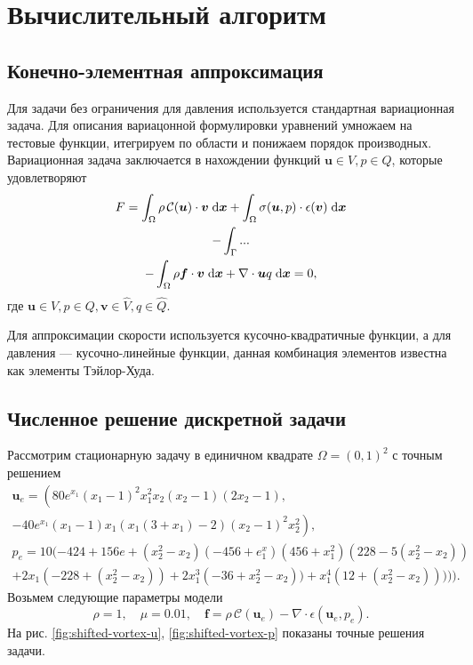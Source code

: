 \documentclass[a4paper,10pt]{report}
\begin{document}
\section{Вычислительный алгоритм}

\subsection{Конечно-элементная аппроксимация}

Для задачи без ограничения для давления используется стандартная вариационная задача.
Для описания вариацонной формулировки уравнений умножаем на тестовые функции, итегрируем по области и понижаем порядок производных. Вариационная задача заключается в нахождении функций $\bm{u} \in V, p \in Q$, которые удовлетворяют
\begin{equation}
\begin{gathered}
F = \int_\Omega \rho \,\mathcal{C}(\bm{u}) \cdot \bm{v} \;{\rm d}\bm{x} 
 + \int_\Omega \sigma(\bm{u}, p) \cdot \epsilon(\bm{v}) \;{\rm d}\bm{x} \\
 - \int_\Gamma ... \\
 - \int_\Omega \rho \bm{f} \cdot \bm{v} \;{\rm d}\bm{x} 
 + \nabla \cdot \bm{u} q \;{\rm d}\bm{x} = 0,
\end{gathered}
\label{eq:nonlinear-form}
\end{equation}
где $\bm{u} \in V, p \in Q, \bm{v} \in \widehat{V}, q \in \widehat{Q}$.

Для аппроксимации скорости используется кусочно-квадратичные функции, а для давления --- кусочно-линейные функции, данная комбинация элементов известна как элементы Тэйлор-Худа.

\subsection{Численное решение дискретной задачи}

Рассмотрим стационарную задачу в единичном квадрате $\Omega=(0,1)^2$ с точным решением
\begin{equation}
\begin{gathered}
\bm{u}_e = \left(80 e^{x_1}(x_1 - 1)^2 x_1^2 x_2 (x_2 -  1) (2 x_2 - 1),\right.\\
\left. -40 e^{x_1} (x_1 - 1) x_1 (x_1 (3 + x_1) - 2) (x_2-1)^2 x_2^2\right), \\
p_e = 10 (-424 + 156 e + (x_2^2-x_2) (-456 + e^x_1) (456 + x_1^2) (228 - 5 (x_2^2 - x_2)) \\
+ 2 x_1 (-228 + (x_2^2 - x_2)) + 2 x_1^3 (-36 + x_2^2 - x_2)) + x_1^4 (12 + (x_2^2 - x_2))))).
\end{gathered}
\label{eq:shifted-vortex}
\end{equation}
Возьмем следующие параметры модели
\[
\rho = 1, \quad \mu = 0.01, \quad \bm{f} = \rho \,\mathcal{C}(\bm{u}_e) - \nabla \cdot \epsilon(\bm{u}_e, p_e).
\]
На рис. \ref{fig:shifted-vortex-u}, \ref{fig:shifted-vortex-p} показаны точные решения задачи.
\end{document}

